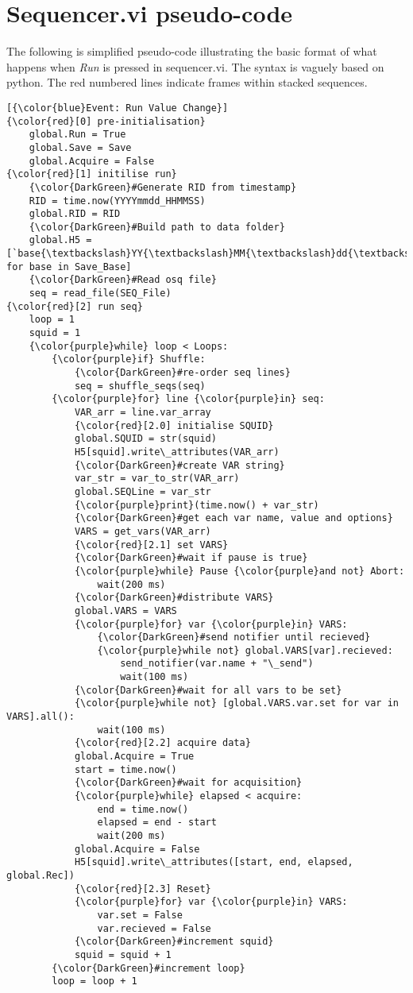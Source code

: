 \documentclass[10pt,a4paper]{article}
\begin{document}
\section{\label{sex:pseudo}Sequencer.vi pseudo-code}
The following is simplified pseudo-code illustrating the basic format of what happens when \emph{Run} is pressed in sequencer.vi.  The syntax is vaguely based on python.  The red numbered lines indicate frames within stacked sequences.
\begin{Verbatim}[commandchars=\\\{\}]
[{\color{blue}Event: Run Value Change}]
{\color{red}[0] pre-initialisation}
	global.Run = True
	global.Save = Save
	global.Acquire = False
{\color{red}[1] initilise run}
	{\color{DarkGreen}#Generate RID from timestamp}
	RID = time.now(YYYYmmdd_HHMMSS) 
	global.RID = RID
	{\color{DarkGreen}#Build path to data folder} 
	global.H5 = [`base{\textbackslash}YY{\textbackslash}MM{\textbackslash}dd{\textbackslash}RID' for base in Save_Base]
	{\color{DarkGreen}#Read osq file}
	seq = read_file(SEQ_File)
{\color{red}[2] run seq}
	loop = 1
	squid = 1
	{\color{purple}while} loop < Loops:
		{\color{purple}if} Shuffle:
			{\color{DarkGreen}#re-order seq lines}	
			seq = shuffle_seqs(seq)
		{\color{purple}for} line {\color{purple}in} seq:
			VAR_arr = line.var_array
			{\color{red}[2.0] initialise SQUID}
			global.SQUID = str(squid)
			H5[squid].write\_attributes(VAR_arr)
			{\color{DarkGreen}#create VAR string}
			var_str = var_to_str(VAR_arr)
			global.SEQLine = var_str
			{\color{purple}print}(time.now() + var_str)
			{\color{DarkGreen}#get each var name, value and options}	
			VARS = get_vars(VAR_arr)
			{\color{red}[2.1] set VARS}
			{\color{DarkGreen}#wait if pause is true}
			{\color{purple}while} Pause {\color{purple}and not} Abort:
				wait(200 ms)
			{\color{DarkGreen}#distribute VARS}
			global.VARS = VARS
			{\color{purple}for} var {\color{purple}in} VARS:
				{\color{DarkGreen}#send notifier until recieved}
				{\color{purple}while not} global.VARS[var].recieved:
					send_notifier(var.name + "\_send")
					wait(100 ms)
			{\color{DarkGreen}#wait for all vars to be set}
			{\color{purple}while not} [global.VARS.var.set for var in VARS].all():
				wait(100 ms)
			{\color{red}[2.2] acquire data}
			global.Acquire = True
			start = time.now()
			{\color{DarkGreen}#wait for acquisition}
			{\color{purple}while} elapsed < acquire:
				end = time.now()
				elapsed = end - start
				wait(200 ms)
			global.Acquire = False
			H5[squid].write\_attributes([start, end, elapsed, global.Rec])
			{\color{red}[2.3] Reset}
			{\color{purple}for} var {\color{purple}in} VARS:
				var.set = False
				var.recieved = False
			{\color{DarkGreen}#increment squid}
			squid = squid + 1
		{\color{DarkGreen}#increment loop}
		loop = loop + 1

\end{Verbatim}
\end{document}
